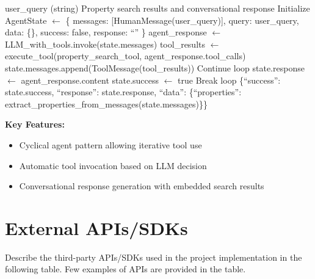 \begin{algorithm}[H]
\caption{Listing Agent Workflow}
\label{alg:listing}
\begin{algorithmic}[1]
\REQUIRE user\_query (string)
\ENSURE Property search results and conversational response
\STATE Initialize AgentState $\leftarrow$ \{
\STATE \quad messages: [HumanMessage(user\_query)],
\STATE \quad query: user\_query,
\STATE \quad data: \{\},
\STATE \quad success: false,
\STATE \quad response: ``''
\STATE \}
\STATE
\STATE {}
    \STATE {}
    \STATE agent\_response $\leftarrow$ LLM\_with\_tools.invoke(state.messages)
    \STATE
    \STATE {}
        \STATE {}
        \STATE tool\_results $\leftarrow$ execute\_tool(property\_search\_tool, agent\_response.tool\_calls)
        \STATE state.messages.append(ToolMessage(tool\_results))
        \STATE Continue loop
    \ELSE
        \STATE {}
        \STATE state.response $\leftarrow$ agent\_response.content
        \STATE state.success $\leftarrow$ true
        \STATE Break loop
    \ENDIF
\ENDWHILE
\RETURN \{``success'': state.success, ``response'': state.response, ``data'': \{``properties'': extract\_properties\_from\_messages(state.messages)\}\}
\end{algorithmic}
\end{algorithm}

\textbf{Key Features:}
\begin{itemize}
    \item Cyclical agent pattern allowing iterative tool use
    \item Automatic tool invocation based on LLM decision
    \item Conversational response generation with embedded search results
\end{itemize}

\section{External APIs/SDKs}

Describe the third-party APIs/SDKs used in the project implementation in the following table. Few examples of APIs are provided in the table.

